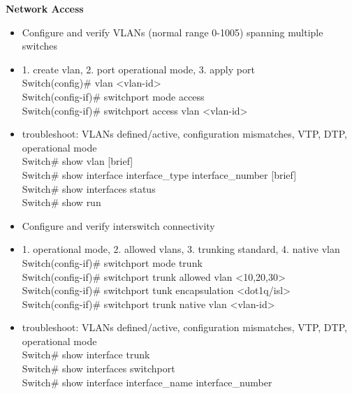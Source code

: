 \documentclass{article}
\begin{document}
\begin{flushleft}\textbf{Network Access}\end{flushleft}
\begin{itemize}
  \item Configure and verify VLANs (normal range 0-1005) spanning multiple switches
	\item[] 1. create vlan, 2. port operational mode, 3. apply port\\
		Switch(config)\# vlan \textless vlan-id\textgreater\\
		Switch(config-if)\# switchport mode access\\
		Switch(config-if)\# switchport access vlan \textless vlan-id\textgreater
  	\item[] troubleshoot: VLANs defined/active, configuration mismatches, VTP, DTP, operational mode\\
  		Switch\# show vlan [brief]\\
  		Switch\# show interface interface\_type interface\_number [brief]\\
  		Switch\# show interfaces status\\
  		Switch\# show run
  	
  \item Configure and verify interswitch connectivity
  	\item[] 1. operational mode, 2. allowed vlans, 3. trunking standard, 4. native vlan\\
  		Switch(config-if)\# switchport mode trunk\\
  		Switch(config-if)\# switchport trunk allowed vlan \textless 10,20,30\textgreater\\
  		Switch(config-if)\# switchport tunk encapsulation \textless dot1q/isl\textgreater\\
  		Switch(config-if)\# switchport trunk native vlan \textless vlan-id\textgreater
  	\item[] troubleshoot: VLANs defined/active, configuration mismatches, VTP, DTP, operational mode \\
  		Switch\# show interface trunk\\
  		Switch\# show interfaces switchport\\
  		Switch\# show interface interface\_name interface\_number
  		

\end{itemize}
\end{document}
